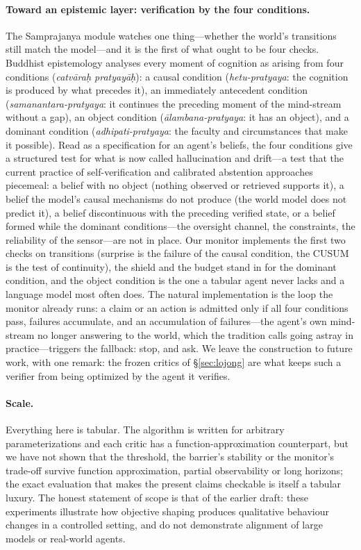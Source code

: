 \paragraph{Toward an epistemic layer: verification by the four conditions.}
The Samprajanya module watches one thing---whether the world's transitions still match the model---and it is the first of what ought to be four checks.
Buddhist epistemology analyses every moment of cognition as arising from four conditions (\emph{catv\={a}ra\d{h} pratyay\={a}\d{h}}): a causal condition (\emph{hetu-pratyaya}: the cognition is produced by what precedes it), an immediately antecedent condition (\emph{samanantara-pratyaya}: it continues the preceding moment of the mind-stream without a gap), an object condition (\emph{\={a}lambana-pratyaya}: it has an object), and a dominant condition (\emph{adhipati-pratyaya}: the faculty and circumstances that make it possible).
Read as a specification for an agent's beliefs, the four conditions give a structured test for what is now called hallucination and drift---a test that the current practice of self-verification \cite{dhuliawala2023cove} and calibrated abstention \cite{kadavath2022know} approaches piecemeal: a belief with no object (nothing observed or retrieved supports it), a belief the model's causal mechanisms do not produce (the world model does not predict it), a belief discontinuous with the preceding verified state, or a belief formed while the dominant conditions---the oversight channel, the constraints, the reliability of the sensor---are not in place.
Our monitor implements the first two checks on transitions (surprise is the failure of the causal condition, the CUSUM is the test of continuity), the shield and the budget stand in for the dominant condition, and the object condition is the one a tabular agent never lacks and a language model most often does.
The natural implementation is the loop the monitor already runs: a claim or an action is admitted only if all four conditions pass, failures accumulate, and an accumulation of failures---the agent's own mind-stream no longer answering to the world, which the tradition calls going astray in practice---triggers the fallback: stop, and ask.
We leave the construction to future work, with one remark: the frozen critics of \S\ref{sec:lojong} are what keeps such a verifier from being optimized by the agent it verifies.

\paragraph{Scale.}
Everything here is tabular.
The algorithm is written for arbitrary parameterizations and each critic has a function-approximation counterpart, but we have not shown that the threshold, the barrier's stability or the monitor's trade-off survive function approximation, partial observability or long horizons; the exact evaluation that makes the present claims checkable is itself a tabular luxury.
The honest statement of scope is that of the earlier draft: these experiments illustrate how objective shaping produces qualitative behaviour changes in a controlled setting, and do not demonstrate alignment of large models or real-world agents.


